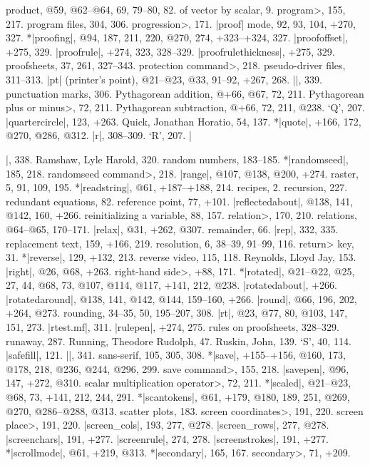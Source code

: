 product, @59, @62--@64, 69, 79--80, 82.
\sub of vector by scalar, 9.
\<program>, 155, 217.
program files, 304, 306.
\<progression>, 171.
|proof| mode, 92, 93, 104, +270, 327.
*|proofing|, @94, 187, 211, 220, @270, 274, +323--+324, 327.
|proofoffset|, +275, 329.
|proofrule|, +274, 323, 328--329.
|proofrulethickness|, +275, 329.
proofsheets, 37, 261, 327--343.
\<protection command>, 218.
pseudo-driver files, 311--313.
|pt| (printer's point), @21--@23, @33, 91--92, +267, 268.
|\punct|, 339.
punctuation marks, 306.
Pythagorean addition, @+66, @67, 72, 211.
\<Pythagorean plus or minus>, 72, 211.
Pythagorean subtraction, @+66, 72, 211, @238.
\newletter
`Q', 207.
|quartercircle|, 123, +263.
Quick, Jonathan Horatio, 54, 137.
*|quote|, +166, 172, @270, @286, @312.
\newletter
|r|, 308--309.
`R', 207.
|\raggedright|, 338.
Ramshaw, Lyle Harold, 320.
random numbers, 183--185.
*|randomseed|, 185, 218.
\<randomseed command>, 218.
|range|, @107, @138, @200, +274.
raster, 5, 91, 109, 195.
*|readstring|, @61, +187--+188, 214.
recipes, 2.
recursion, 227.
redundant equations, 82.
reference point, 77, +101.
|reflectedabout|, @138, 141, @142, 160, +266.
reinitializing a variable, 88, 157.
\<relation>, 170, 210.
relations, @64--@65, 170--171.
|relax|, @31, +262, @307.
remainder, 66.
|rep|, 332, 335.
replacement text, 159, +166, 219.
resolution, 6, 38--39, 91--99, 116.
\<return> key, 31.
*|reverse|, 129, +132, 213.
reverse video, 115, 118.
Reynolds, Lloyd Jay, 153.
|right|, @26, @68, +263.
\<right-hand side>, +88, 171.
*|rotated|, @21--@22, @25, 27, 44, @68, 73, @107, @114, @117, +141, 212, @238.
|rotatedabout|, +266.
|rotatedaround|, @138, 141, @142, @144, 159--160, +266.
|round|, @66, 196, 202, +264, @273.
rounding, 34--35, 50, 195--207, 308.
|rt|, @23, @77, 80, @103, 147, 151, 273.
|rtest.mf|, 311.
|rulepen|, +274, 275.
rules on proofsheets, 328--329.
runaway, 287.
Running, Theodore Rudolph, 47.
Ruskin, John, 139.
\newletter
`S', 40, 114.
|safefill|, 121.
|\sample|, 341.
sans-serif, 105, 305, 308.
*|save|, +155--+156, @160, 173, @178, 218, @236, @244, @296, 299.
\<save command>, 155, 218.
|savepen|, @96, 147, +272, @310.
\<scalar multiplication operator>, 72, 211.
*|scaled|, @21--@23, @68, 73, +141, 212, 244, 291.
*|scantokens|, @61, +179, @180, 189, 251, @269, @270, @286--@288, @313.
scatter plots, 183.
\<screen coordinates>, 191, 220.
\<screen place>, 191, 220.
|screen_cols|, 193, 277, @278.
|screen_rows|, 277, @278.
|screenchars|, 191, +277.
|screenrule|, 274, 278.
|screenstrokes|, 191, +277.
*|scrollmode|, @61, +219, @313.
*|secondary|, 165, 167.
\<secondary>, 71, +209.
